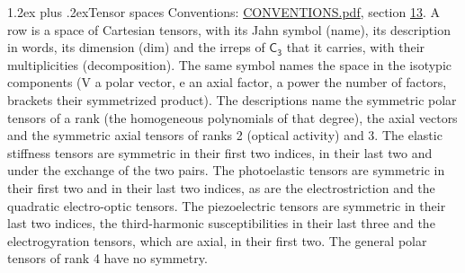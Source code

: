 \documentclass[10pt,a4paper]{article}
\makeatletter
\renewcommand\section{\@startsection{section}{1}{\z@}{-3ex plus -1ex minus -.2ex}%
  {1.2ex plus .2ex}{\normalfont\large\sffamily\bfseries\color{parttitle}}}
\numberwithin{equation}{section}
\newcommand{\grp}[1]{\mathsf{#1}}
\makeatother
\begin{document}
\section{Tensor spaces}\label{s:tensor_spaces}
Conventions: \href{../../CONVENTIONS.pdf}{CONVENTIONS.pdf}, section \href{../../CONVENTIONS.pdf\#conv.13}{13}.
\leavevmode\label{n:head.name}\label{n:head.description}\label{n:head.dim}\label{n:head.decomposition}A row is a space of Cartesian tensors, with its Jahn symbol (name), its description in words, its dimension (dim) and the irreps of $\grp{C_{3}}$ that it carries, with their multiplicities (decomposition). \label{n:label.jahn}The same symbol names the space in the isotypic components (V a polar vector, e an axial factor, a power the number of factors, brackets their symmetrized product). The descriptions name the symmetric polar tensors of a rank (the homogeneous polynomials of that degree), the axial vectors and the symmetric axial tensors of ranks 2 (optical activity) and 3. The elastic stiffness tensors are symmetric in their first two indices, in their last two and under the exchange of the two pairs. The photoelastic tensors are symmetric in their first two and in their last two indices, as are the electrostriction and the quadratic electro-optic tensors. The piezoelectric tensors are symmetric in their last two indices, the third-harmonic susceptibilities in their last three and the electrogyration tensors, which are axial, in their first two. The general polar tensors of rank 4 have no symmetry.
\end{document}
